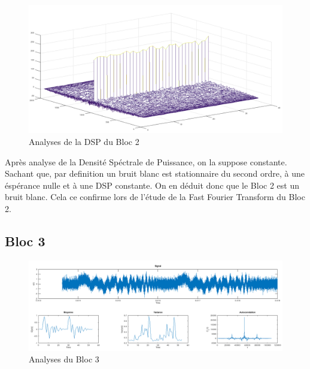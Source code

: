 \documentclass[french, a4paper, 12pt, openany]{book}
\begin{document}
	\begin{figure}[ht]
		\begin{center}
		\includegraphics[scale=0.25]{images/AutoCorrBloc2.png}
		\end{center}
		\caption{Analyses de la DSP du Bloc 2}
		\label{Analyses de la DSP du Bloc 2}
	\end{figure}

	Après analyse de la Densité Spéctrale de Puissance, on la suppose constante. \\
	Sachant que, par definition un bruit blanc est stationnaire du second ordre, à une éspérance nulle et à une DSP constante. On en déduit donc que le Bloc 2 est un bruit blanc. Cela ce confirme lors de l'étude de la Fast Fourier Transform du Bloc 2.

  \subsection{Bloc 3}

	\begin{figure}[ht]
		\begin{center}
		\includegraphics[scale=0.25]{images/SignalBloc3.png}
		\end{center}
		\caption{Analyses du Bloc 3}
		\label{Analyses du Bloc 3}
	\end{figure}
\end{document}
